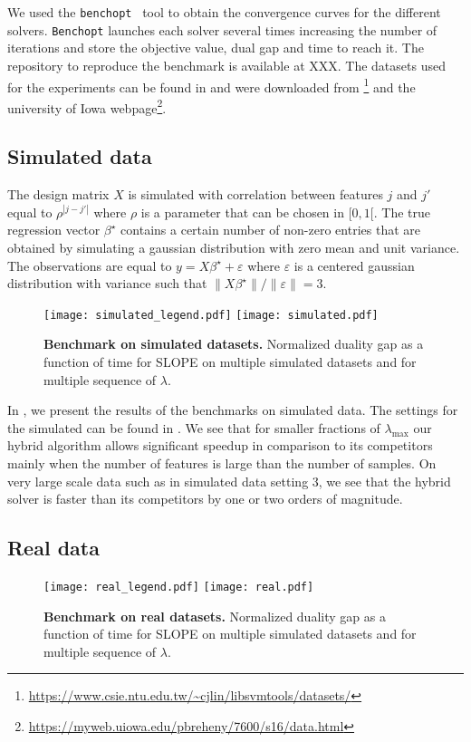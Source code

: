 We used the \texttt{benchopt}~\parencite{moreau2022benchopt} tool to obtain the convergence curves for the different solvers.
\texttt{Benchopt} launches each solver several times increasing the number of iterations and store the objective value, dual gap and time to reach it.
The repository to reproduce the benchmark is available at XXX.
The datasets used for the experiments can be found in  and were downloaded from \footnote{\url{https://www.csie.ntu.edu.tw/~cjlin/libsvmtools/datasets/}} and the university of Iowa webpage\footnote{\url{https://myweb.uiowa.edu/pbreheny/7600/s16/data.html}}.


\subsection{Simulated data}

The design matrix $X$ is simulated with correlation between features $j$ and $j'$ equal to $\rho^{|j-j'|}$ where $\rho$ is a parameter that can be chosen in $[0, 1[$.
The true regression vector $\beta^\star$ contains a certain number of non-zero entries that are obtained by simulating a gaussian distribution with zero mean and unit variance.
The observations are equal to $y=X\beta^\star + \varepsilon$ where $\varepsilon$ is a centered gaussian distribution with variance such that $\lVert X\beta^\star\rVert / \lVert \varepsilon \rVert = 3$.
\begin{figure*}[htb]
  \centering
  \texttt{[image: simulated\_legend.pdf]}
  \texttt{[image: simulated.pdf]}
  \caption{\textbf{Benchmark on simulated datasets.} Normalized duality gap as a function of time for SLOPE on multiple simulated datasets and for multiple sequence of $\lambda$.}
  \label{fig:simulated}
\end{figure*}

In , we present the results of the benchmarks on simulated data.
The settings for the simulated can be found in .
We see that for smaller fractions of $\lambda_{\text{max}}$ our hybrid algorithm allows significant speedup in comparison to its competitors mainly when the number of features is large than the number of samples.
On very large scale data such as in simulated data setting $3$, we see that the hybrid solver is faster than its competitors by one or two orders of magnitude.


\subsection{Real data}
\begin{figure*}[htb]
  \centering
  \texttt{[image: real\_legend.pdf]}
  \texttt{[image: real.pdf]}
  \caption{\textbf{Benchmark on real datasets.} Normalized duality gap as a function of time for SLOPE on multiple simulated datasets and for multiple sequence of $\lambda$.}
  \label{fig:real}
\end{figure*}
